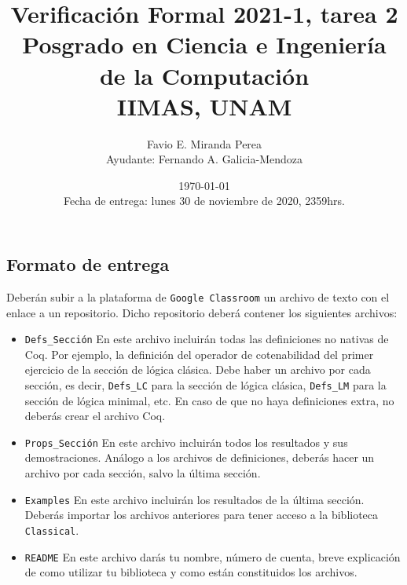 \documentclass[letterpaper, 11 pt]{article}
\title{Verificación Formal 2021-1, tarea 2\\
Posgrado en Ciencia e Ingeniería de la Computación\\
IIMAS, UNAM}
\author{Favio E. Miranda Perea\\
Ayudante: Fernando A. Galicia-Mendoza}
\date{\today\\ Fecha de entrega: lunes 30 de noviembre de 2020, 2359hrs.}
\begin{document}
\maketitle

\subsection*{Formato de entrega}
Deberán subir a la plataforma de {\tt Google Classroom} un archivo de texto con el enlace a un repositorio. Dicho repositorio deberá  contener los siguientes archivos:
\begin{itemize}
    \item {\tt Defs\_\textlangle Sección\textrangle} En este archivo incluirán todas las definiciones no nativas de {\sf Coq}. Por ejemplo, la definición del operador de cotenabilidad del primer ejercicio de la sección de lógica clásica. Debe haber un archivo por cada sección, es decir, {\tt Defs\_LC} para la sección de lógica clásica, {\tt Defs\_LM} para la sección de lógica minimal, etc. En caso de que no haya definiciones extra, no deberás crear el archivo {\sf Coq}.
    \item {\tt Props\_\textlangle Sección\textrangle} En este archivo incluirán todos los resultados y sus demostraciones. Análogo a los archivos de definiciones, deberás hacer un archivo por cada sección, salvo la última sección.
    \item {\tt Examples} En este archivo incluirán los resultados de la última sección. Deberás importar los archivos anteriores para tener acceso a la biblioteca {\tt Classical}.
    \item {\tt README} En este archivo darás tu nombre, número de cuenta, breve explicación de como utilizar tu biblioteca y como  están constituidos los archivos.
\end{itemize}
\end{document}
